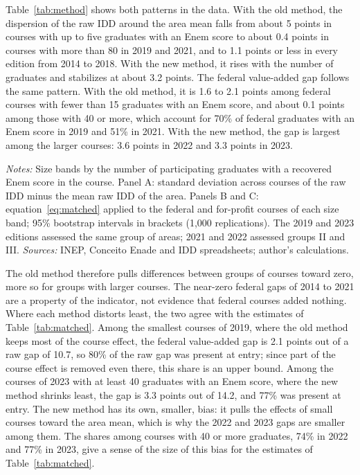\documentclass[12pt,letterpaper]{article}
\begin{document}
Table~\ref{tab:method} shows both patterns in the data. With the old method, the dispersion of the raw IDD around the area mean falls from about 5 points in courses with up to five graduates with an Enem score to about 0.4 points in courses with more than 80 in 2019 and 2021, and to 1.1 points or less in every edition from 2014 to 2018. With the new method, it rises with the number of graduates and stabilizes at about 3.2 points. The federal value-added gap follows the same pattern. With the old method, it is 1.6 to 2.1 points among federal courses with fewer than 15 graduates with an Enem score, and about 0.1 points among those with 40 or more, which account for 70\% of federal graduates with an Enem score in 2019 and 51\% in 2021. With the new method, the gap is largest among the larger courses: 3.6 points in 2022 and 3.3 points in 2023.

\begin{table}[!htbp]
\centering\small
\caption{The IDD method and course size: dispersion of the IDD and federal gaps}\label{tab:method}

\begin{minipage}{\linewidth}\vspace{0.4em}\scriptsize
\textit{Notes:} Size bands by the number of participating graduates with a recovered Enem score in the course. Panel A: standard deviation across courses of the raw IDD minus the mean raw IDD of the area. Panels B and C: equation~\eqref{eq:matched} applied to the federal and for-profit courses of each size band; 95\% bootstrap intervals in brackets (1,000 replications). The 2019 and 2023 editions assessed the same group of areas; 2021 and 2022 assessed groups II and III. \textit{Sources:} INEP, Conceito Enade and IDD spreadsheets; author's calculations.
\end{minipage}
\end{table}

The old method therefore pulls differences between groups of courses toward zero, more so for groups with larger courses. The near-zero federal gaps of 2014 to 2021 are a property of the indicator, not evidence that federal courses added nothing. Where each method distorts least, the two agree with the estimates of Table~\ref{tab:matched}. Among the smallest courses of 2019, where the old method keeps most of the course effect, the federal value-added gap is 2.1 points out of a raw gap of 10.7, so 80\% of the raw gap was present at entry; since part of the course effect is removed even there, this share is an upper bound. Among the courses of 2023 with at least 40 graduates with an Enem score, where the new method shrinks least, the gap is 3.3 points out of 14.2, and 77\% was present at entry. The new method has its own, smaller, bias: it pulls the effects of small courses toward the area mean, which is why the 2022 and 2023 gaps are smaller among them. The shares among courses with 40 or more graduates, 74\% in 2022 and 77\% in 2023, give a sense of the size of this bias for the estimates of Table~\ref{tab:matched}.
\end{document}
